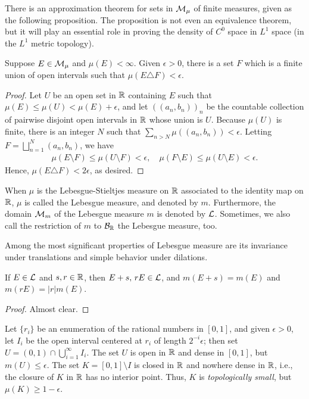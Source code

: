 There is an approximation theorem for sets in ${\mathcal{M}}_\mu$ of finite measures, given as the following proposition.
The proposition is not even an equivalence theorem, but it will play an essential role in proving the density of $C^0$ space in $L^1$ space (in the $L^1$ metric topology).
\begin{prop}
    Suppose $E\in{\mathcal{M}}_\mu$ and $\mu(E)<\infty$.
    Given $\epsilon>0$, there is a set $F$ which is a finite union of open intervals such that $\mu(E\triangle F)<\epsilon$.
\end{prop}
\begin{proof}
    Let $U$ be an open set in ${\mathbb{R}}$ containing $E$ such that $\mu(E)\leq\mu(U)<\mu(E)+\epsilon$, and let $((a_n, b_n))_n$ be the countable collection of pairwise disjoint open intervals in ${\mathbb{R}}$ whose union is $U$.
    Because $\mu(U)$ is finite, there is an integer $N$ such that $\sum_{n>N}\mu((a_n, b_n))<\epsilon$.
    Letting $F=\bigsqcup_{n=1}^N (a_n, b_n)$, we have
    \begin{align*}
        \mu(E\setminus F)\leq\mu(U\setminus F)<\epsilon,\quad \mu(F\setminus E)\leq\mu(U\setminus E)<\epsilon.
    \end{align*}
    Hence, $\mu(E\triangle F)<2\epsilon$, as desired.
\end{proof}

\begin{nota}
    When $\mu$ is the Lebesgue-Stieltjes measure on ${\mathbb{R}}$ associated to the identity map on ${\mathbb{R}}$, $\mu$ is called the Lebesgue measure, and denoted by $m$.
    Furthermore, the domain ${\mathcal{M}}_m$ of the Lebesgue measure $m$ is denoted by ${\mathcal{L}}$.
    Sometimes, we also call the restriction of $m$ to ${\mathcal{B}}_{\mathbb{R}}$ the Lebesgue measure, too.
\end{nota}

Among the most significant properties of Lebesgue measure are its invariance under translations and simple behavior under dilations.
\begin{prop}
    If $E\in{\mathcal{L}}$ and $s, r\in{\mathbb{R}}$, then $E+s,\,rE\in{\mathcal{L}}$, and $m(E+s)=m(E)$ and $m(rE)=|r|m(E)$.
\end{prop}
\begin{proof}
    Almost clear.
\end{proof}

\begin{exmp}
    Let $\{r_i\}$ be an enumeration of the rational numbers in $[0, 1]$, and given $\epsilon>0$, let $I_i$ be the open interval centered at $r_i$ of length $2^{-i}\epsilon$; then set $U=(0, 1)\cap\bigcup_{i=1}^\infty I_i$.
    The set $U$ is open in ${\mathbb{R}}$ and dense in $[0, 1]$, but $m(U)\leq\epsilon$.
    The set $K=[0, 1]\setminus I$ is closed in ${\mathbb{R}}$ and nowhere dense in ${\mathbb{R}}$, i.e., the closure of $K$ in ${\mathbb{R}}$ has no interior point.
    Thus, $K$ is \textit{topologically small}, but $\mu(K)\geq 1-\epsilon$.
\end{exmp}

